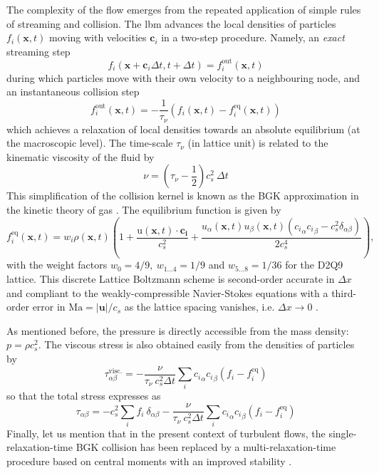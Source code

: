\documentclass{jfm}
\newcommand{\EL}[1]{{\color{myred}{#1}}}
\begin{document}
%
The complexity of the flow emerges from the repeated application of simple rules of streaming and collision. The \ac{lbm} advances the local densities of particles $f_i(\mathbf{x},t)$ moving with velocities $\mathbf{c}_i$  in a two-step procedure. Namely, an \emph{exact} streaming step
\begin{equation}
  \label{eq:lbe}
  f_i(\mathbf{x}+\mathbf{c}_i \Delta t, t + \Delta t) = f_i^{\mathrm{out}}(\mathbf{x},t)
\end{equation}
during which particles move with their own velocity to a neighbouring node, and an instantaneous collision step
\[
f_i^{\mathrm{out}}(\mathbf{x},t) = -\frac 1 {\tau_\nu} \left(f_i(\mathbf{x},t) - f_i^\mathrm{eq}(\mathbf{x},t) \right)
\]
which achieves a relaxation of local densities towards an absolute equilibrium (at the macroscopic level). The time-scale $\tau_\nu$ (in lattice unit) is related to the kinematic viscosity of the fluid by
\[
\nu = \left( {\tau_\nu} - \frac 1 2 \right) c_s^2 ~\Delta t
\]
This simplification of the collision kernel is known as the BGK approximation in the kinetic theory of gas \EL{\citep{BGK}}.
%
The equilibrium function is given by
\begin{equation}
  \label{eq:lbe_eq}
  f_i^\mathrm{eq}(\mathbf{x},t) = w_i  \rho(\mathbf{x},t) \left( 1 + \frac{\mathrm u(\mathbf{x},t) \cdot \mathbf{c_i}}{c_s^2} +
    \frac{u_\alpha(\mathbf{x},t) u_\beta(\mathbf{x},t)({c_i}_\alpha {c_i}_\beta - c_s^2 \delta_{\alpha\beta})}{2 c_s^4} \right),
\end{equation}
with the weight factors $w_0=4/9,~w_{1...4} = 1/9$ and $w_{5...8}=1/36$ for the D2Q9 lattice.
This discrete Lattice Boltzmann scheme is second-order accurate in $\Delta x $ and compliant to the weakly-compressible Navier-Stokes equations with a third-order error in $\mathrm{Ma}=|\mathbf{u}|/c_s$ as the lattice spacing vanishes, i.e. $\Delta x \to 0$ \EL{\citep{succi_book}}.

As mentioned before, the pressure is directly accessible from the mass density: $p = \rho c_s^2$. The viscous stress is also obtained easily from the densities of particles by
\[
\tau^\mathrm{visc.}_{\alpha \beta} = -\frac{\nu}{\tau_\nu ~ c_s^2 \Delta t} \sum_i  {c_i}_\alpha {c_i}_\beta (f_i - f_i^\mathrm{eq})
\]
so that the total stress expresses as
\begin{equation}\label{eq:def_stress}
\tau_{\alpha \beta} = -  c_s^2 \sum_i f_i ~ \delta_{\alpha\beta}  - \frac{\nu}{\tau_\nu ~ c_s^2 \Delta t} \sum_i  {c_i}_\alpha {c_i}_\beta (f_i - f_i^\mathrm{eq})
\end{equation}
Finally, let us mention that in the present context of turbulent flows, the single-relaxation-time BGK collision has been replaced by a multi-relaxation-time procedure based on central moments with an improved stability \citep{De_Rosis_2016}.
\end{document}
